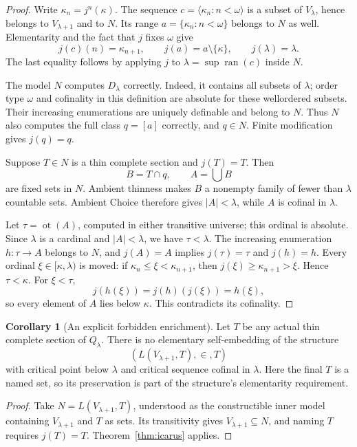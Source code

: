 \documentclass[11pt,letterpaper]{article}
\theoremstyle{definition}
\newtheorem{corollary}[definition]{Corollary}
\newcommand{\ot}{\operatorname{ot}}
\numberwithin{equation}{section}
\newcommand{\ran}{\operatorname{ran}}
\begin{document}
\begin{proof}
Write $\kappa_n=j^n(\kappa)$. The sequence
$c=\langle\kappa_n:n<\omega\rangle$ is a subset of $V_\lambda$, hence belongs
to $V_{\lambda+1}$ and to $N$. Its range
$a=\{\kappa_n:n<\omega\}$ belongs to $N$ as well. Elementarity and the fact
that $j$ fixes $\omega$ give
\[
 j(c)(n)=\kappa_{n+1},\qquad j(a)=a\setminus\{\kappa\},
 \qquad j(\lambda)=\lambda.
\]
The last equality follows by applying $j$ to $\lambda=\sup\ran(c)$ inside
$N$.

The model $N$ computes $D_\lambda$ correctly. Indeed, it contains all subsets
of $\lambda$; order type $\omega$ and cofinality in this definition are
absolute for these wellordered subsets. Their increasing enumerations are
uniquely definable and belong to $N$. Thus $N$ also computes the full class
$q=[a]$ correctly, and $q\in N$. Finite modification gives $j(q)=q$.

Suppose $T\in N$ is a thin complete section and $j(T)=T$. Then
\[
                 B=T\cap q,\qquad A=\bigcup B
\]
are fixed sets in $N$. Ambient thinness makes $B$ a nonempty family of fewer
than $\lambda$ countable sets. Ambient Choice therefore gives $|A|<\lambda$,
while $A$ is cofinal in $\lambda$.

Let $\tau=\ot(A)$, computed in either transitive universe; this ordinal is
absolute. Since $\lambda$ is a cardinal and $|A|<\lambda$, we have
$\tau<\lambda$. The increasing enumeration $h:\tau\to A$ belongs to $N$,
and $j(A)=A$ implies $j(\tau)=\tau$ and $j(h)=h$. Every ordinal
$\xi\in[\kappa,\lambda)$ is moved: if
$\kappa_n\le\xi<\kappa_{n+1}$, then
$j(\xi)\ge\kappa_{n+1}>\xi$. Hence $\tau<\kappa$. For $\xi<\tau$,
\[
                    j(h(\xi))=j(h)(j(\xi))=h(\xi),
\]
so every element of $A$ lies below $\kappa$. This contradicts its cofinality.
\end{proof}

\begin{corollary}[An explicit forbidden enrichment]\label{cor:icarus-enrichment}
Let $T$ be any actual thin complete section of $Q_\lambda$. There is no
elementary self-embedding of the structure
\[
                       (L(V_{\lambda+1},T),\in,T)
\]
with critical point below $\lambda$ and critical sequence cofinal in $\lambda$.
Here the final $T$ is a named set, so its preservation is part of the
structure's elementarity requirement.
\end{corollary}

\begin{proof}
Take $N=L(V_{\lambda+1},T)$, understood as the constructible inner model
containing $V_{\lambda+1}$ and $T$ as sets. Its transitivity gives
$V_{\lambda+1}\subseteq N$, and naming $T$ requires $j(T)=T$.
Theorem~\ref{thm:icarus} applies.
\end{proof}
\end{document}
